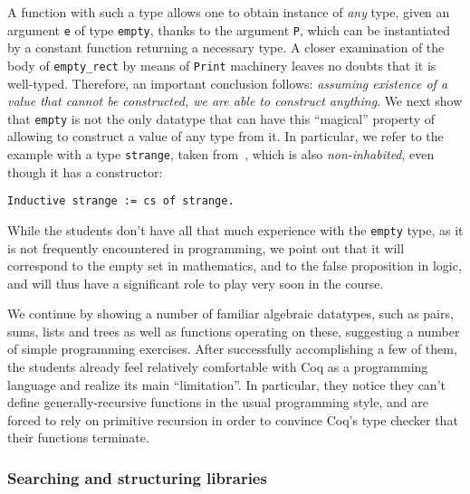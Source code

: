 \documentclass[blockstyle,preprint,nocopyrightspace]{sigplanconf}
\newcommand{\an}[1]{\textcolor{red}{(Aleks: {#1})}}
\newcommand{\code}[1]{\lstinline{#1}}
\begin{document}
A function with such a type allows one to obtain instance of
\emph{any} type, given an argument \code{e} of type \code{empty},
thanks to the argument \code{P}, which can be instantiated by a
constant function returning a necessary type. A closer examination of
the body of \code{empty_rect} by means of \code{Print} machinery
leaves no doubts that it is well-typed. Therefore, an important
conclusion follows: \emph{assuming existence of a value that cannot be
  constructed, we are able to construct anything}. We next show that
\code{empty} is not the only datatype that can have this ``magical''
property of allowing to construct a value of any type from it. In
particular, we refer to the example with a type \code{strange}, taken
from~\cite{Bertot-Casteran:BOOK}, which is also \emph{non-inhabited},
even though it has a constructor:
%
\begin{lstlisting}
Inductive strange := cs of strange.
\end{lstlisting}
%
%
%
While the students don't have all that much experience with the
\code{empty} type, as it is not frequently encountered in programming,
we point out that it will correspond to the empty set in mathematics,
and to the false proposition in logic, and will thus have a
significant role to play very soon in the course.

We continue by showing a number of familiar algebraic datatypes, such
as pairs, sums, lists and trees as well as functions operating on
these, suggesting a number of simple programming exercises. After
successfully accomplishing a few of them, the students already feel
relatively comfortable with Coq as a programming language and realize
its main ``limitation''. In particular, they notice they can't define
generally-recursive functions in the usual programming style, and are
forced to rely on primitive recursion in order to convince Coq's type
checker that their functions terminate.

\subsubsection{Searching and structuring libraries}
\label{sec:search-defin}
\end{document}
